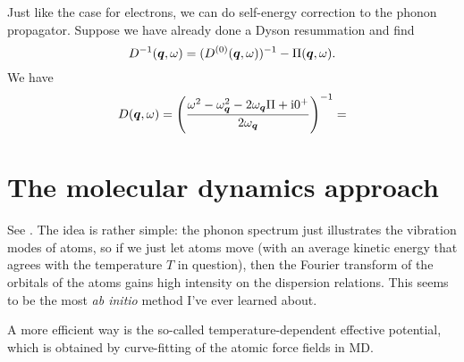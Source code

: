 \documentclass[hyperref, a4paper]{article}
\newcommand*{\ii}{\mathrm{i}}
\newcommand*{\abinitio}{\textit{ab initio}}
\begin{document}
Just like the case for electrons, 
we can do self-energy correction to the phonon propagator.
Suppose we have already done a Dyson resummation 
and find 
\begin{equation}
    D^{-1}(\vb*{q}, \omega) = (D^{(0)}(\vb*{q}, \omega))^{-1} - \Pi(\vb*{q}, \omega).
\end{equation}
We have 
\begin{equation}
    D(\vb*{q}, \omega) = \left(
        \frac{\omega^2 - \omega_{\vb*{q}}^2 - 2 \omega_{\vb*{q}} \Pi + \ii 0^+}{2 \omega_{\vb*{q}}}
    \right)^{-1}
    = 
\end{equation}

\section{The molecular dynamics approach}

See \cite{zhang2022finite}. 
The idea is rather simple: 
the phonon spectrum just illustrates 
the vibration modes of atoms,
so if we just let atoms move 
(with an average kinetic energy that agrees 
with the temperature $T$ in question),
then the Fourier transform 
of the orbitals of the atoms 
gains high intensity 
on the dispersion relations.
This seems to be the most \abinitio{} method I've ever learned about.

A more efficient way is the so-called temperature-dependent effective potential,
which is obtained by curve-fitting of the atomic force fields in MD.

\printbibliography
\end{document}

